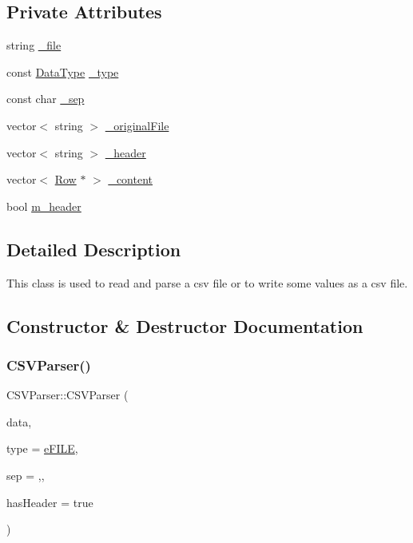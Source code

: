 \subsection*{Private Attributes}
\begin{DoxyCompactItemize}
\item 
string \hyperlink{class_c_s_v_parser_a1db17c9285f8fdcaed2499747582e4a9}{\+\_\+file}
\item 
const \hyperlink{_c_s_vparser_8hpp_ad8ed01ff3ff33333d8e19db4d2818bb6}{Data\+Type} \hyperlink{class_c_s_v_parser_a27cff8e618160b2685f1e05b8a7da9cf}{\+\_\+type}
\item 
const char \hyperlink{class_c_s_v_parser_a9d778da8bd668d2393d4402ce7eae9cd}{\+\_\+sep}
\item 
vector$<$ string $>$ \hyperlink{class_c_s_v_parser_afa0c154dd897b5ddcbf8364a9df28eeb}{\+\_\+original\+File}
\item 
vector$<$ string $>$ \hyperlink{class_c_s_v_parser_a9b35b0a143febb8fb388769417fa0777}{\+\_\+header}
\item 
vector$<$ \hyperlink{class_row}{Row} $\ast$ $>$ \hyperlink{class_c_s_v_parser_adff6872f7e93cbc10797bac6173671d4}{\+\_\+content}
\item 
bool \hyperlink{class_c_s_v_parser_a4dcb7bb113b65d0abf816dd899395545}{m\+\_\+header}
\end{DoxyCompactItemize}


\subsection{Detailed Description}
This class is used to read and parse a csv file or to write some values as a csv file. 

\subsection{Constructor \& Destructor Documentation}
\mbox{\label{class_c_s_v_parser_aba4d9ee88285f39766e7cc810f46d9d9}} 
\subsubsection{\texorpdfstring{C\+S\+V\+Parser()}{CSVParser()}}
{\footnotesize\ttfamily C\+S\+V\+Parser\+::\+C\+S\+V\+Parser (\begin{DoxyParamCaption}\item[{const string \&}]{data,  }\item[{const \hyperlink{_c_s_vparser_8hpp_ad8ed01ff3ff33333d8e19db4d2818bb6}{Data\+Type} \&}]{type = {\ttfamily \hyperlink{_c_s_vparser_8hpp_ad8ed01ff3ff33333d8e19db4d2818bb6a99e2aefa5a03705fd10b8b72e081349f}{e\+F\+I\+LE}},  }\item[{char}]{sep = {\ttfamily \textquotesingle{},\textquotesingle{}},  }\item[{bool}]{has\+Header = {\ttfamily true} }\end{DoxyParamCaption})}

